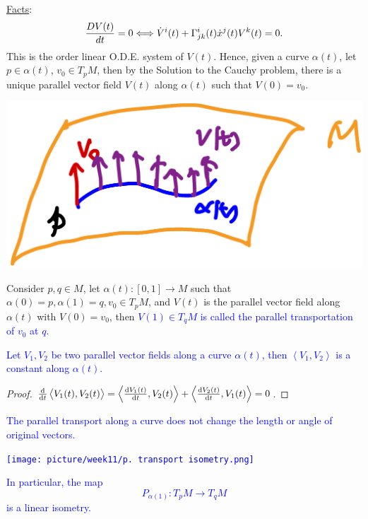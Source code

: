 \underline{Facts}:
\[
    \frac{DV(t)}{dt}=0\Longleftrightarrow 
    \dot{V}^i(t)+\Gamma\indices*{_{jk}^i}(t)\dot{x}^j(t)V^k(t)=0.    
\]
This is the  order linear O.D.E. system of
\(V(t)\). Hence, given a curve \(\alpha(t)\), let \(p\in\alpha(t)\),
\(v_0\in T_p M\), then by the Solution to the Cauchy problem, there is 
a unique parallel vector field \(V(t)\) along \(\alpha(t)\) such that 
\(V(0)=v_0\). 
\begin{center}
    \includegraphics[scale=0.25]{picture/week11/parallel transport.png}
\end{center}
Consider \(p,q\in M\), let \(\alpha(t)\colon[0,1]\to M\) such that 
\(\alpha(0)=p,\alpha(1)=q,v_0\in T_p M\), and \(V(t)\) is the parallel 
vector field along \(\alpha(t)\) with \(V(0)=v_0\), then 
\textcolor{blue}{
    \(V(1)\in T_q M\) is called the parallel transportation of 
    \(v_0\) at \(q\).
}
\textcolor{blue}{
    \begin{proposition}
        Let \(V_1,V_2\) be two parallel vector fields along a curve 
        \(\alpha(t)\), then \(\left\langle V_1,V_2 \right\rangle\)
        is a constant along \(\alpha(t)\).
    \end{proposition}
}
\begin{proof}
    \(\dv{t}\left\langle V_1(t),V_2(t)\right\rangle
    =\left\langle\dv{V_1(t)}{t},V_2(t)\right\rangle
    +\left\langle\dv{V_2(t)}{t},V_1(t)\right\rangle
    =0\).
\end{proof}
\textcolor{blue}{
    \begin{corollary}
        The parallel transport along a curve does not
        change the length or angle of original vectors.
        \begin{center}
            \texttt{[image: picture/week11/p. transport 
            isometry.png]}
        \end{center}
        In particular, the map 
        \[  
            P_{\alpha(1)}\colon T_p M\to T_q M
        \]
        is a linear isometry.
    \end{corollary}
}
